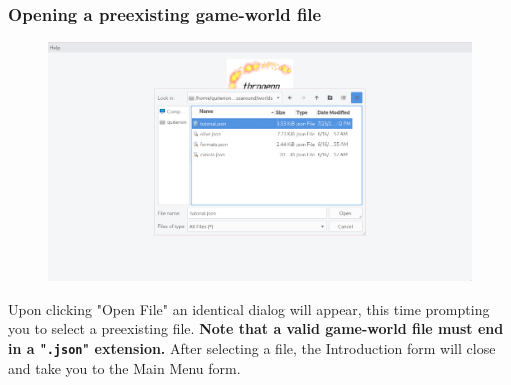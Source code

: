 \documentclass{article} \usepackage[margin=1in,headheight=57pt,headsep=0.1in]{geometry}
\begin{document}
\subsubsection{Opening a preexisting game-world file}
\begin{figure}[H]
	\centering
	\includegraphics[width=1.0\textwidth]{./introFormWithOpenFileDialog.png}
\end{figure}
Upon clicking "Open File" an identical dialog will appear, this time prompting you to select a preexisting file. \textbf{Note that a valid game-world file must end in a "\texttt{.json}" extension.} After selecting a file, the Introduction form will close and take you to the Main Menu form.
\newpage
\end{document}
